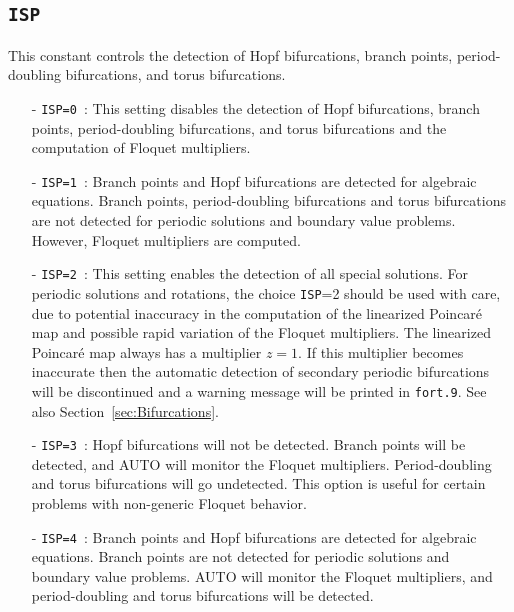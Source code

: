 \documentclass[12pt]{report}
\begin{document}
\subsection{\tt ISP}  \label{sec:ISP}
This constant controls the detection of Hopf bifurcations,
branch points, period-doubling bifurcations, and torus bifurcations. 
\begin{itemize}
\item[-] {\tt ISP=0}~:  
  This setting disables the detection of Hopf bifurcations,
  branch points, period-doubling 
  bifurcations, and torus bifurcations and the computation of 
  Floquet multipliers.
\item[-] {\tt ISP=1}~:  
  Branch points and Hopf bifurcations are detected for algebraic
  equations. Branch points, period-doubling bifurcations and torus
  bifurcations are not detected for periodic solutions and boundary
  value problems. However, Floquet multipliers are computed.
\item[-] {\tt ISP=2}~: This setting enables the detection of all special 
 solutions.
 For periodic solutions and rotations, the choice {\tt ISP}=2 should be used with
 care, due to potential inaccuracy in the computation of the
 linearized Poincar\'e map and possible rapid variation of the
 Floquet multipliers.
 The linearized Poincar\'e map always has a multiplier $z=1$.
 If this multiplier becomes inaccurate
 then the automatic detection of secondary periodic
 bifurcations will be discontinued and a
 warning message will be printed in {\tt fort.9}.
 See also Section~\ref{sec:Bifurcations}.
\item[-] {\tt ISP=3}~:  
  Hopf bifurcations will not be detected. 
  Branch points will be detected, and {\cal AUTO} will monitor the 
  Floquet multipliers. Period-doubling and torus bifurcations will go undetected. 
  This option is useful for certain problems with non-generic Floquet behavior.
\item[-] {\tt ISP=4}~:  
  Branch points and Hopf bifurcations are detected for algebraic
  equations. Branch points are not detected for
  periodic solutions and boundary value problems.
  {\cal AUTO} will monitor the Floquet multipliers, and period-doubling
  and torus bifurcations will be detected.
\end{itemize}
\end{document}
